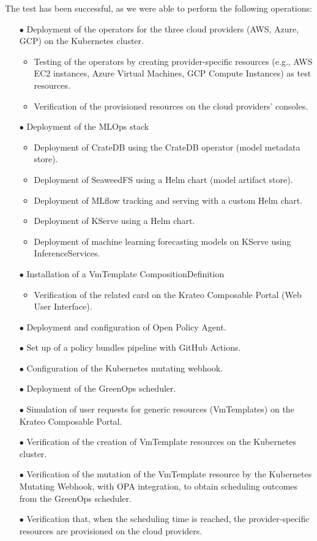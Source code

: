 The test has been successful, as we were able to perform the following operations:
\begin{itemize}[itemsep=0.2pt, topsep=1pt]
    \item[$\bullet$] Deployment of the operators for the three cloud providers (AWS, Azure, GCP) on the Kubernetes cluster.
    \begin{itemize}[label=$\circ$]
        \item Testing of the operators by creating provider-specific resources (e.g., AWS EC2 instances, Azure Virtual Machines, GCP Compute Instances) as test resources.
        \item Verification of the provisioned resources on the cloud providers' consoles.
    \end{itemize}
    \item[$\bullet$] Deployment of the MLOps stack
    \begin{itemize}[label=$\circ$]
        \item Deployment of CrateDB using the CrateDB operator (model metadata store).
        \item Deployment of SeaweedFS using a Helm chart (model artifact store).
        \item Deployment of MLflow tracking and serving with a custom Helm chart.
        \item Deployment of KServe using a Helm chart.
        \item Deployment of machine learning forecasting models on KServe using InferenceServices.
    \end{itemize}
    \item[$\bullet$] Installation of a VmTemplate CompositionDefinition
    \begin{itemize}[label=$\circ$]
        \item Verification of the related card on the Krateo Composable Portal (Web User Interface).
    \end{itemize}
    \item[$\bullet$] Deployment and configuration of Open Policy Agent.
    \item[$\bullet$] Set up of a policy bundles pipeline with GitHub Actions.
    \item[$\bullet$] Configuration of the Kubernetes mutating webhook.
    \item[$\bullet$] Deployment of the GreenOps scheduler.
    \item[$\bullet$] Simulation of user requests for generic resources (VmTemplates) on the Krateo Composable Portal.
    \item[$\bullet$] Verification of the creation of VmTemplate resources on the Kubernetes cluster.
    \item[$\bullet$] Verification of the mutation of the VmTemplate resource by the Kubernetes Mutating Webhook, with OPA integration, to obtain scheduling outcomes from the GreenOps scheduler.
    \item[$\bullet$] Verification that, when the scheduling time is reached, the provider-specific resources are provisioned on the cloud providers.
\end{itemize}


